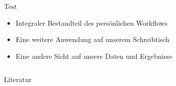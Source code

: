 \documentclass[final,hyperref={pdfpagelabels=false}]{beamer}
\begin{document}
\begin{frame}[t]
\begin{columns}[t]
\begin{column}{.465\textwidth}
\vspace{0.3cm}

\begin{block}{Test}
	
	\begin{itemize}
		\item Integraler Bestandteil des persönlichen Workflows
		\item Eine weitere Anwendung auf unserem Schreibtisch
		\item Eine andere Sicht auf unsere Daten und Ergebnisse
	\end{itemize}
	\vspace{320px}
\end{block}

\vspace{0.1cm}

\end{column} %

\begin{column}{.015\textwidth}\end{column} %

\end{columns} %

\begin{block}{Literatur}
	
	\nocite{pries:19}
	
\end{block}

\end{frame} %
\end{document}
